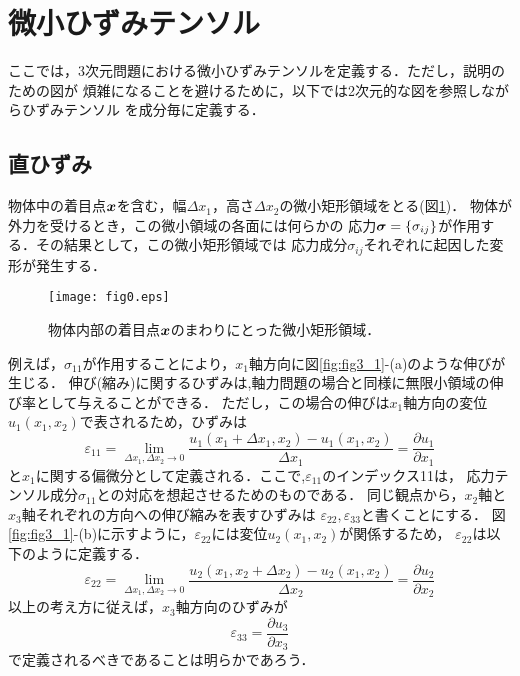 \documentclass[10pt,a4j]{jbook}
\begin{document}
\section{微小ひずみテンソル}
ここでは，3次元問題における微小ひずみテンソルを定義する．ただし，説明のための図が
煩雑になることを避けるために，以下では2次元的な図を参照しながらひずみテンソル
を成分毎に定義する．
\subsection{直ひずみ}
物体中の着目点$\mbox{\boldmath $x$}$を含む，幅$\Delta x_1$，高さ$\Delta x_2$の微小矩形領域をとる(図\ref{fig:fig0})．
物体が外力を受けるとき，この微小領域の各面には何らかの
応力$\mbox{\boldmath $\sigma$}=\{\sigma_{ij}\}$が作用する．その結果として，この微小矩形領域では
応力成分$\sigma_{ij}$それぞれに起因した変形が発生する．
\begin{figure}[h]
	\begin{center}
	\texttt{[image: fig0.eps]} 
	\end{center}
	\caption{物体内部の着目点$\mbox{\boldmath $x$}$のまわりにとった微小矩形領域．} 
	\label{fig:fig0}
\end{figure}
例えば，$\sigma_{11}$が作用することにより，$x_1$軸方向に図\ref{fig:fig3_1}-(a)のような伸びが生じる．
伸び(縮み)に関するひずみは,軸力問題の場合と同様に無限小領域の伸び率として与えることができる．
ただし，この場合の伸びは$x_1$軸方向の変位$u_1(x_1,x_2)$で表されるため，ひずみは
\begin{equation}
	\varepsilon_{11}=\lim_{\Delta x_1,\Delta x_2 \rightarrow 0}
	\frac{u_1(x_1+\Delta x_1,x_2)-u_1(x_1,x_2)}{\Delta x_1}
	=\frac{\partial u_1}{\partial x_1}
	\label{eqn:def_e11}
\end{equation}
と$x_1$に関する偏微分として定義される．ここで,$\varepsilon_{11}$のインデックス11は，
応力テンソル成分$\sigma_{11}$との対応を想起させるためのものである．
同じ観点から，$x_2$軸と$x_3$軸それぞれの方向への伸び縮みを表すひずみは
$\varepsilon_{22},\varepsilon_{33}$と書くことにする．
図\ref{fig:fig3_1}-(b)に示すように，$\varepsilon_{22}$には変位$u_2(x_1,x_2)$が関係するため，
$\varepsilon_{22}$は以下のように定義する．
\begin{equation}
	\varepsilon_{22}=\lim_{\Delta x_1,\Delta x_2 \rightarrow 0}
	\frac{u_2(x_1,x_2+\Delta x_2)-u_2(x_1,x_2)}{\Delta x_2}
	=\frac{\partial u_2}{\partial x_2}
	\label{eqn:def_e22}
\end{equation}
以上の考え方に従えば，$x_3$軸方向のひずみが
\begin{equation}
	\varepsilon_{33}=\frac{\partial u_3}{\partial x_3}
\end{equation}
で定義されるべきであることは明らかであろう．
\end{document}
